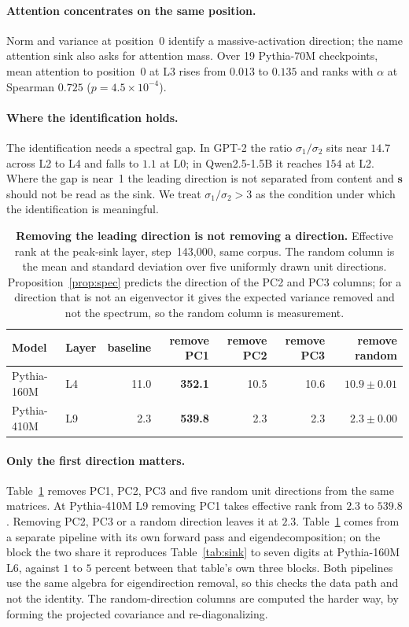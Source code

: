\documentclass{article}
\theoremstyle{spaced}
\theoremstyle{definition}
\newcommand{\bs}{\mathbf{s}}
\begin{document}
\paragraph{Attention concentrates on the same position.} Norm and variance at position~0 identify a massive-activation direction; the name attention sink also asks for attention mass. Over 19 Pythia-70M checkpoints, mean attention to position~0 at L3 rises from $0.013$ to $0.135$ and ranks with $\alpha$ at Spearman $0.725$ ($p = 4.5\times10^{-4}$).

\paragraph{Where the identification holds.} The identification needs a spectral gap. In GPT-2 the ratio $\sigma_1/\sigma_2$ sits near $14.7$ across L2 to L4 and falls to $1.1$ at L0; in Qwen2.5-1.5B it reaches $154$ at L2. Where the gap is near~1 the leading direction is not separated from content and $\bs$ should not be read as the sink. We treat $\sigma_1/\sigma_2 > 3$ as the condition under which the identification is meaningful.

\begin{table}[t]
\centering
\caption{\textbf{Removing the leading direction is not removing a direction.} Effective rank at the peak-sink layer, step~143{,}000, same corpus. The random column is the mean and standard deviation over five uniformly drawn unit directions. Proposition~\ref{prop:spec} predicts the direction of the PC2 and PC3 columns; for a direction that is not an eigenvector it gives the expected variance removed and not the spectrum, so the random column is measurement.}
\label{tab:spec}
\small
\begin{tabular}{@{}llrrrrr@{}}
\toprule
\textbf{Model} & \textbf{Layer} & \textbf{baseline} & \textbf{remove PC1} & \textbf{remove PC2} & \textbf{remove PC3} & \textbf{remove random} \\
\midrule
Pythia-160M & L4 & 11.0 & \textbf{352.1} & 10.5 & 10.6 & $10.9 \pm 0.01$ \\
Pythia-410M & L9 & 2.3  & \textbf{539.8} & 2.3  & 2.3  & $2.3 \pm 0.00$ \\
\bottomrule
\end{tabular}
\end{table}

\paragraph{Only the first direction matters.} Table~\ref{tab:spec} removes PC1, PC2, PC3 and five random unit directions from the same matrices. At Pythia-410M L9 removing PC1 takes effective rank from $2.3$ to $539.8$. Removing PC2, PC3 or a random direction leaves it at $2.3$. Table~\ref{tab:spec} comes from a separate pipeline with its own forward pass and eigendecomposition; on the block the two share it reproduces Table~\ref{tab:sink} to seven digits at Pythia-160M L6, against $1$ to $5$ percent between that table's own three blocks. Both pipelines use the same algebra for eigendirection removal, so this checks the data path and not the identity. The random-direction columns are computed the harder way, by forming the projected covariance and re-diagonalizing.
\end{document}
